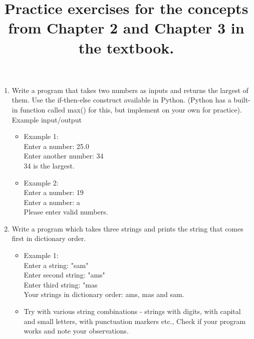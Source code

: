 \documentclass[10pt,a4paper]{article}
\title{Practice exercises for the concepts from Chapter 2 and Chapter 3 in the textbook.}
\begin{document}
\maketitle
\begin{enumerate}
\item Write a program that takes two numbers as inputs and returns the largest of them. Use the if-then-else construct available in Python. (Python has a built-in function called max() for this, but implement on your own for practice). Example input/output
\begin{itemize}
\item Example 1: 
\\ Enter a number: 25.0
\\ Enter another number: 34
\\ 34 is the largest.
\item Example 2:
\\ Enter a number: 19
\\ Enter a number: a
\\ Please enter valid numbers.
\end{itemize}

\item Write a program which takes three strings and prints the string that comes first in dictionary order.
\begin{itemize}
\item Example 1: 
\\ Enter a string: "sam"
\\ Enter second string: "ams"
\\ Enter third string: "mas
\\ Your strings in dictionary order: ams, mas and sam.
\item Try with various string combinations - strings with digits, with capital and small letters, with punctuation markers etc., Check if your program works and note your observations.
\end{itemize}


\end{enumerate}
\end{document}
